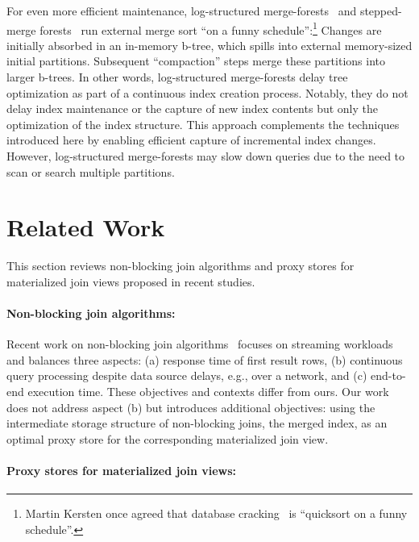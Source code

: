 \documentclass[biblatex, english]{lni}
\begin{document}
For even more efficient maintenance, log-structured merge-forests~\cite{ONeil1996LSMTree} and stepped-merge forests~\cite{Jagadish1997LSM} run external merge sort ``on a funny schedule'':\footnote{
    Martin Kersten once agreed that database cracking~\cite{tozun2024reminiscences,DatabaseCracking} is ``quicksort on a funny schedule''.
}
Changes are initially absorbed in an in-memory b-tree, which spills into external memory-sized initial partitions.
Subsequent ``compaction'' steps merge these partitions into larger b-trees.
In other words, log-structured merge-forests delay tree optimization as part of a continuous index creation process.
Notably, they do not delay index maintenance or the capture of new index contents but only the optimization of the index structure.
This approach complements the techniques introduced here by enabling efficient capture of incremental index changes.
However, log-structured merge-forests may slow down queries due to the need to scan or search multiple partitions.

\section{Related Work}\label{sec:prior}

This section reviews non-blocking join algorithms and proxy stores for materialized join views proposed in recent studies.

\paragraph{Non-blocking join algorithms:}

Recent work on non-blocking join algorithms~\cite{Dittrich2002PMJ, Chen2010prjoin, Urhan2000XJoinAR, mokbel2004hash} focuses on streaming workloads and balances three aspects: (a) response time of first result rows, (b) continuous query processing despite data source delays, e.g., over a network, and (c) end-to-end execution time.
These objectives and contexts differ from ours.
Our work does not address aspect (b) but introduces additional objectives: using the intermediate storage structure of non-blocking joins, the merged index, as an optimal proxy store for the corresponding materialized join view.

\paragraph{Proxy stores for materialized join views:}
\end{document}
